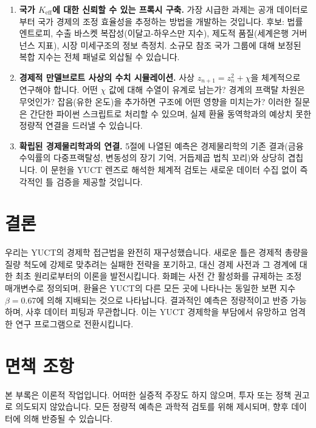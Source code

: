 \documentclass[12pt,a4paper]{article}
\theoremstyle{remark}
\begin{document}
	\begin{enumerate}[label=(\roman*)]
		\item \textbf{국가 \(K_{\mathrm{eff}}\)에 대한 신뢰할 수 있는 프록시 구축.} 가장 시급한 과제는 공개 데이터로부터 국가 경제의 조정 효율성을 추정하는 방법을 개발하는 것입니다. 후보: 법률 엔트로피, 수출 바스켓 복잡성(이달고-하우스만 지수), 제도적 품질(세계은행 거버넌스 지표), 시장 미세구조의 정보 측정치. 소규모 참조 국가 그룹에 대해 보정된 복합 지수는 전체 패널로 외삽될 수 있습니다.
		
		\item \textbf{경제적 만델브로트 사상의 수치 시뮬레이션.} 사상 \(z_{n+1} = z_n^2 + \chi\)을 체계적으로 연구해야 합니다. 어떤 \(\chi\) 값에 대해 수열이 유계로 남는가? 경계의 프랙탈 차원은 무엇인가? 잡음(유한 온도)을 추가하면 구조에 어떤 영향을 미치는가? 이러한 질문은 간단한 파이썬 스크립트로 처리할 수 있으며, 실제 환율 동역학과의 예상치 못한 정량적 연결을 드러낼 수 있습니다.
		
		\item \textbf{확립된 경제물리학과의 연결.} 5절에 나열된 예측은 경제물리학의 기존 결과(금융 수익률의 다중프랙탈성, 변동성의 장기 기억, 거듭제곱 법칙 꼬리)와 상당히 겹칩니다. 이 문헌을 YUCT 렌즈로 해석한 체계적 검토는 새로운 데이터 수집 없이 즉각적인 틀 검증을 제공할 것입니다.
	\end{enumerate}
	
	\section{결론}
	
	우리는 YUCT의 경제학 접근법을 완전히 재구성했습니다. 새로운 틀은 경제적 총량을 질량 척도에 강제로 맞추려는 실패한 전략을 포기하고, 대신 경제 사전과 그 경계에 대한 최초 원리로부터의 이론을 발전시킵니다. 화폐는 사전 간 활성화를 규제하는 조정 매개변수로 정의되며, 환율은 YUCT의 다른 모든 곳에 나타나는 동일한 보편 지수 \(\beta = 0.67\)에 의해 지배되는 것으로 나타납니다. 결과적인 예측은 정량적이고 반증 가능하며, 사후 데이터 피팅과 무관합니다. 이는 YUCT 경제학을 부담에서 유망하고 엄격한 연구 프로그램으로 전환시킵니다.
	
	\section*{면책 조항}
	
	본 부록은 이론적 작업입니다. 어떠한 실증적 주장도 하지 않으며, 투자 또는 정책 권고로 의도되지 않았습니다. 모든 정량적 예측은 과학적 검토를 위해 제시되며, 향후 데이터에 의해 반증될 수 있습니다.
	
\end{document}
